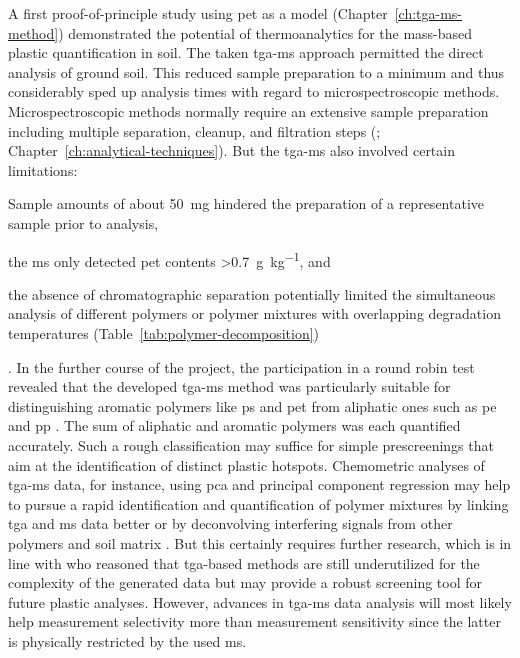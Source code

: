 A first proof-of-principle study using \ac{pet} as a model (Chapter~\ref{ch:tga-ms-method}) demonstrated the potential of thermoanalytics for the mass-based plastic quantification in soil. The taken \ac{tga-ms} approach permitted the direct analysis of ground soil. This reduced sample preparation to a minimum and thus considerably sped up analysis times with regard to microspectroscopic methods. Microspectroscopic methods normally require an extensive sample preparation including multiple separation, cleanup, and filtration steps (\citealp[for instance,][]{LoderEnzymatic2017}; Chapter~\ref{ch:analytical-techniques}). But the \ac{tga-ms} also involved certain limitations:
\begin{enumerate*}
	\item Sample amounts of about \SI{50}{\milli\gram} hindered the preparation of a representative sample prior to analysis,
	\item the \ac{ms} only detected \ac{pet} contents \SI{>0.7}{\gram\per\kilo\gram}, and
	\item the absence of chromatographic separation potentially limited the simultaneous analysis of different polymers or polymer mixtures with overlapping degradation temperatures (Table~\ref{tab:polymer-decomposition})
\end{enumerate*}.
In the further course of the project, the participation in a round robin test revealed that the developed \ac{tga-ms} method was particularly suitable for distinguishing aromatic polymers like \ac{ps} and \ac{pet} from aliphatic ones such as \ac{pe} and \ac{pp} \citep{BeckerQuantification2020}. The sum of aliphatic and aromatic polymers was each quantified accurately. Such a rough classification may suffice for simple prescreenings that aim at the identification of distinct plastic hotspots.
Chemometric analyses of \ac{tga-ms} data, for instance, using \ac{pca} and principal component regression may help to pursue a rapid identification and quantification of polymer mixtures by linking \ac{tga} and \ac{ms} data better or by deconvolving interfering signals from other polymers and soil matrix \citep{DavidIntroducing2019}. But this certainly requires further research, which is in line with \citet{MansaThermogravimetric2021} who reasoned that \ac{tga}-based methods are still underutilized for the complexity of the generated data but may provide a robust screening tool for future plastic analyses. However, advances in \ac{tga-ms} data analysis will most likely help measurement selectivity more than measurement sensitivity since the latter is physically restricted by the used \ac{ms}.

